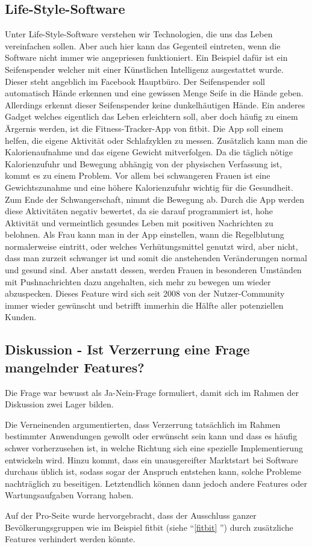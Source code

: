 \subsection{Life-Style-Software}
Unter Life-Style-Software verstehen wir Technologien, die uns das Leben vereinfachen sollen. Aber auch hier kann das Gegenteil eintreten, wenn die Software nicht immer wie angepriesen funktioniert. 
Ein Beispiel dafür ist ein Seifenspender welcher mit einer Künstlichen Intelligenz ausgestattet wurde. Dieser steht angeblich im Facebook Hauptbüro. 
Der Seifenspender soll automatisch Hände erkennen und eine gewissen Menge Seife in die Hände geben. Allerdings erkennt dieser Seifenspender keine dunkelhäutigen Hände.  \newline 
\label{fitbit}
Ein anderes Gadget welches eigentlich das Leben erleichtern soll, aber doch häufig zu einem Ärgernis werden, ist die Fitness-Tracker-App von fitbit. Die App soll einem helfen, die eigene Aktivität oder Schlafzyklen zu messen. Zusätzlich kann man die Kalorienaufnahme und das eigene Gewicht mitverfolgen. Da die täglich nötige Kalorienzufuhr und Bewegung abhängig von der physischen Verfassung ist, kommt es zu einem Problem. Vor allem bei schwangeren Frauen ist eine Gewichtszunahme und eine höhere Kalorienzufuhr wichtig für die Gesundheit. Zum Ende der Schwangerschaft, nimmt die Bewegung ab. Durch die App werden diese Aktivitäten negativ bewertet, da sie darauf programmiert ist, hohe Aktivität und vermeintlich gesundes Leben mit positiven Nachrichten zu belohnen. 
Als Frau kann man in der App einstellen, wann die Regelblutung normalerweise eintritt, oder welches Verhütungsmittel genutzt wird, aber nicht, dass man zurzeit schwanger ist und somit die anstehenden Veränderungen normal und gesund sind. \citeauthor{becomingmotherblog2017}
Aber anstatt dessen, werden Frauen in besonderen Umständen mit Pushnachrichten dazu angehalten, sich mehr zu bewegen um wieder abzuspecken. 
Dieses Feature wird sich seit 2008 von der Nutzer-Community immer wieder gewünscht und betrifft immerhin die Hälfte aller potenziellen Kunden. 


\subsection{Diskussion - Ist Verzerrung eine Frage mangelnder Features?}
Die Frage war bewusst als Ja-Nein-Frage formuliert, damit sich im Rahmen der Diskussion zwei Lager bilden.

Die Verneinenden argumentierten, dass Verzerrung tatsächlich im Rahmen bestimmter Anwendungen gewollt oder erwünscht sein kann und dass es häufig schwer vorherzusehen ist, in welche Richtung sich eine spezielle Implementierung entwickeln wird. Hinzu kommt, dass ein unausgereifter Marktstart bei Software durchaus üblich ist, sodass sogar der Anspruch entstehen kann, solche Probleme nachträglich zu beseitigen. Letztendlich können dann jedoch andere Features oder Wartungsaufgaben Vorrang haben.

Auf der Pro-Seite wurde hervorgebracht, dass der Ausschluss ganzer Bevölkerungsgruppen wie im Beispiel fitbit (siehe \enquote{\ref{fitbit} }) durch zusätzliche Features verhindert werden könnte.
